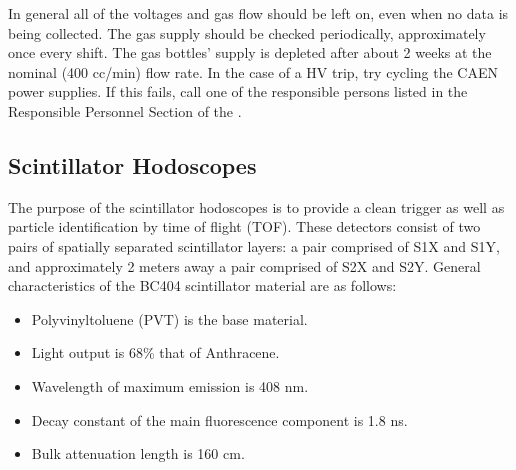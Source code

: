 {%

In general all of the voltages and gas flow should be left on, even when
no data is being collected.  The gas supply should be checked periodically,
approximately once every shift.  The gas bottles' supply is depleted
after about 2 weeks at the nominal (400 cc/min) flow rate.
In the case of a HV trip, try cycling the CAEN power supplies.  If this fails, call
one of the responsible persons listed in the Responsible Personnel Section
of the .




\subsection{Scintillator Hodoscopes}

The purpose of the scintillator hodoscopes is to provide a clean
trigger as well as particle identification by time of flight (TOF). These
detectors consist of two pairs of spatially separated scintillator
layers: a pair comprised of S1X and S1Y, and approximately 2 meters away a pair
comprised of S2X and S2Y. General characteristics of the BC404 scintillator
material are as follows:

\begin{itemize}
\item{Polyvinyltoluene (PVT) is the base material. }
\item{Light output is 68\% that of Anthracene. }
\item{Wavelength of maximum emission is 408 nm.}
\item{Decay constant of the main fluorescence component is 1.8 ns.}
\item{Bulk attenuation length is 160 cm.}
\end{itemize}

}
